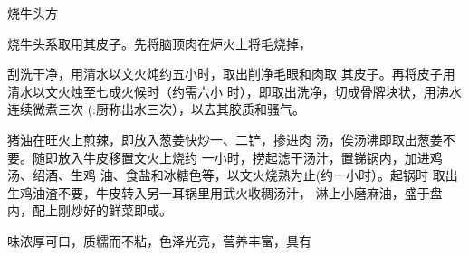 \begin{recipe}{烧牛头方}

\ingredients




\cooking

烧牛头系取用其皮子。先将脑顶肉在炉火上将毛烧掉，

刮洗干净，用清水以文火炖约五小时，取出削净毛眼和肉取 其皮子。再将皮子用清水以文火烛至七成火候时（约需六小 时），即取出洗净，切成骨牌块状，用沸水连续微煮三次 (:厨称出水三次），以去其胶质和骚气。

猪油在旺火上煎辣，即放入葱姜快炒一、二铲，掺进肉 汤，俟汤沸即取出葱姜不要。随即放入牛皮移置文火上烧约 一小时，捞起滤干汤汁，置锑锅内，加进鸡汤、绍酒、生鸡 油、食盐和冰糖色等，以文火烧熟为止(约一小时）。起锅时 取出生鸡油渣不要，牛皮转入另一耳锅里用武火收稠汤汁， 淋上小磨麻油，盛于盘内，配上刚炒好的鲜菜即成。

\notes

味浓厚可口，质糯而不粘，色泽光亮，营养丰富，具有

\end{recipe}

